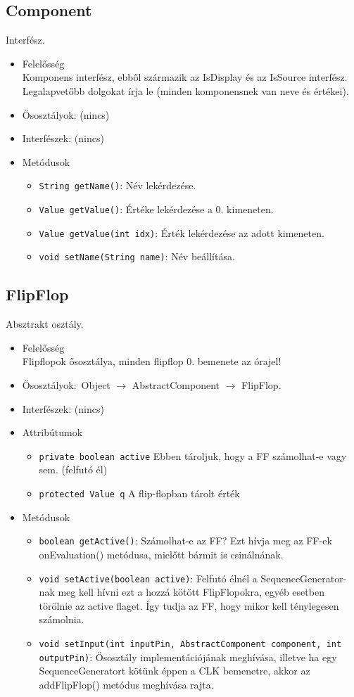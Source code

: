 \subsection{Component}
Interfész.
\begin{itemize}
\item Felelősség\\
Komponens interfész, ebből származik az IsDisplay és az IsSource interfész.  Legalapvetőbb dolgokat írja le (minden komponensnek van neve és értékei).
\item Ősosztályok: (nincs)
\item Interfészek: (nincs)
\item Metódusok$\ $
\begin{itemize}
	\item \texttt{String getName()}: Név lekérdezése.
	\item \texttt{Value getValue()}: Értéke lekérdezése a 0. kimeneten.
	\item \texttt{Value getValue(int idx)}: Érték lekérdezése az adott kimeneten.
	\item \texttt{void setName(String name)}: Név beállítása.
\end{itemize}
\end{itemize}

\subsection{FlipFlop}
Absztrakt osztály.
\begin{itemize}
\item Felelősség\\
Flipflopok ősosztálya, minden flipflop 0. bemenete az órajel!
\item Ősosztályok:\ Object $\rightarrow{}$ AbstractComponent $\rightarrow{}$ FlipFlop.
\item Interfészek: (nincs)
\item Attribútumok $\ $
\begin{itemize}
	\item \texttt{private boolean active} Ebben tároljuk, hogy a FF számolhat-e vagy sem. (felfutó él)
	\item \texttt{protected Value q} A flip-flopban tárolt érték
\end{itemize}
\item Metódusok$\ $
\begin{itemize}
	\item \texttt{boolean getActive()}: Számolhat-e az FF? Ezt hívja meg az FF-ek onEvaluation() metódusa, mielőtt  bármit is csinálnának.
	\item \texttt{void setActive(boolean active)}: Felfutó élnél a SequenceGenerator-nak meg kell hívni ezt a hozzá kötött  FlipFlopokra, egyéb esetben törölnie az active flaget. Így tudja az FF, hogy  mikor kell ténylegesen számolnia.
	\item \texttt{void setInput(int inputPin, AbstractComponent component, int outputPin)}: Ősosztály implementációjának meghívása, illetve ha egy SequenceGeneratort kötünk éppen a CLK bemenetre, akkor az addFlipFlop() metódus meghívása rajta.
\end{itemize}
\end{itemize}

